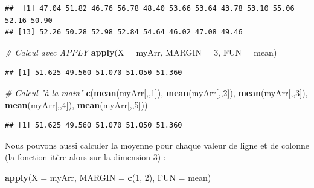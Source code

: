 \documentclass[
]{book}
\newenvironment{Shaded}{\begin{snugshade}}{\end{snugshade}}
\newcommand{\CommentTok}[1]{\textcolor[rgb]{0.56,0.35,0.01}{\textit{#1}}}
\newcommand{\DataTypeTok}[1]{\textcolor[rgb]{0.13,0.29,0.53}{#1}}
\newcommand{\DecValTok}[1]{\textcolor[rgb]{0.00,0.00,0.81}{#1}}
\newcommand{\KeywordTok}[1]{\textcolor[rgb]{0.13,0.29,0.53}{\textbf{#1}}}
\newcommand{\NormalTok}[1]{#1}
\begin{document}
\begin{verbatim}
##  [1] 47.04 51.82 46.76 56.78 48.40 53.66 53.64 43.78 53.10 55.06 52.16 50.90
## [13] 52.26 50.28 52.98 52.84 54.64 46.02 47.08 49.46
\end{verbatim}

\begin{Shaded}
\begin{Highlighting}[]
\CommentTok{# Calcul avec APPLY}
\KeywordTok{apply}\NormalTok{(}\DataTypeTok{X =}\NormalTok{ myArr, }\DataTypeTok{MARGIN =} \DecValTok{3}\NormalTok{, }\DataTypeTok{FUN =}\NormalTok{ mean)}
\end{Highlighting}
\end{Shaded}

\begin{verbatim}
## [1] 51.625 49.560 51.070 51.050 51.360
\end{verbatim}

\begin{Shaded}
\begin{Highlighting}[]
\CommentTok{# Calcul "à la main"}
\KeywordTok{c}\NormalTok{(}\KeywordTok{mean}\NormalTok{(myArr[,,}\DecValTok{1}\NormalTok{]), }\KeywordTok{mean}\NormalTok{(myArr[,,}\DecValTok{2}\NormalTok{]), }\KeywordTok{mean}\NormalTok{(myArr[,,}\DecValTok{3}\NormalTok{]), }
  \KeywordTok{mean}\NormalTok{(myArr[,,}\DecValTok{4}\NormalTok{]), }\KeywordTok{mean}\NormalTok{(myArr[,,}\DecValTok{5}\NormalTok{]))}
\end{Highlighting}
\end{Shaded}

\begin{verbatim}
## [1] 51.625 49.560 51.070 51.050 51.360
\end{verbatim}

Nous pouvons aussi calculer la moyenne pour chaque valeur de ligne et de colonne (la fonction itère alors sur la dimension 3) :

\begin{Shaded}
\begin{Highlighting}[]
\KeywordTok{apply}\NormalTok{(}\DataTypeTok{X =}\NormalTok{ myArr, }\DataTypeTok{MARGIN =} \KeywordTok{c}\NormalTok{(}\DecValTok{1}\NormalTok{, }\DecValTok{2}\NormalTok{), }\DataTypeTok{FUN =}\NormalTok{ mean)}
\end{Highlighting}
\end{Shaded}
\end{document}
